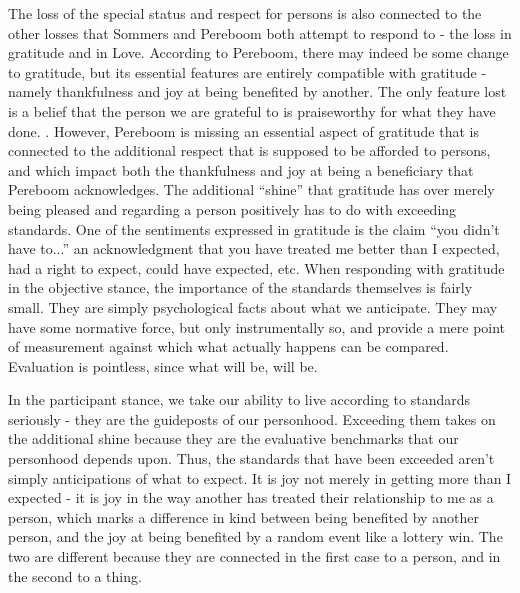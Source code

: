\documentclass[phd,12pt,oneside,paper=letterpaper]{ubcthesis}
\begin{document}
The loss of the special status and respect for persons is also connected to the other losses that Sommers and Pereboom both attempt to respond to - the loss in gratitude and in Love. According to Pereboom, there may indeed be some change to gratitude, but its essential features are entirely compatible with gratitude - namely thankfulness and joy at being benefited by another. The only feature lost is a belief that the person we are grateful to is praiseworthy for what they have done. \citep[p201-2]{pereboom2001}. However, Pereboom is missing an essential aspect of gratitude that is connected to the additional respect that is supposed to be afforded to persons, and which impact both the thankfulness and joy at being a beneficiary that Pereboom acknowledges. The additional ``shine'' that gratitude has over merely being pleased and regarding a person positively has to do with exceeding standards. One of the sentiments expressed in gratitude is the claim ``you didn't have to...'' an acknowledgment that you have treated me better than I expected, had a right to expect, could have expected, etc. When responding with gratitude in the objective stance, the importance of the standards themselves is fairly small. They are simply psychological facts about what we anticipate. They may have some normative force, but only instrumentally so, and provide a mere point of measurement against which what actually happens can be compared. Evaluation is pointless, since what will be, will be. 

In the participant stance, we take our ability to live according to standards seriously - they are the guideposts of our personhood. Exceeding them takes on the additional shine because they are the evaluative benchmarks that our personhood depends upon. Thus, the standards that have been exceeded aren't simply anticipations of what to expect. It is joy not merely in getting more than I expected - it is joy in the way another has treated their relationship to me as a person, which marks a difference in kind between being benefited by another person, and the joy at being benefited by a random event like a lottery win. The two are different because they are connected in the first case to a person, and in the second to a thing. 
\end{document}

